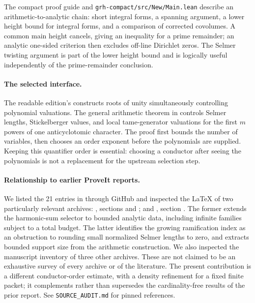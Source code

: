 \documentclass[11pt]{article}
\theoremstyle{remark}\newtheorem{remark}[theorem]{Remark}
\begin{document}
The compact proof guide and \texttt{grh-compact/src/New/Main.lean}
describe an arithmetic-to-analytic chain: short integral forms, a
spanning argument, a lower height bound for integral forms, and a
comparison of corrected covolumes. A common main height cancels, giving
an inequality for a prime remainder; an analytic one-sided criterion then
excludes off-line Dirichlet zeros. The Selmer twisting argument is part of
the lower height bound and is logically useful independently of the
prime-remainder conclusion.

\paragraph{The selected interface.}
The readable edition's 
constructs roots of unity simultaneously controlling polynomial
valuations. The general arithmetic theorem in
 controls Selmer lengths,
Stickelberger values, and local tame-generator valuations for the first
$m$ powers of one anticyclotomic character. The proof first bounds the
number of variables, then chooses an order exponent before the
polynomials are supplied. Keeping this quantifier order is essential:
choosing a conductor after seeing the polynomials is not a replacement
for the upstream selection step.

\paragraph{Relationship to earlier ProveIt reports.}
We listed the 21 entries in  through GitHub and
inspected the LaTeX of two particularly relevant archives:
, sections
 and ; and
, section
. The former extends the harmonic-sum
selector to bounded analytic data, including infinite families subject
to a total budget. The latter identifies the growing ramification index
as an obstruction to rounding small normalized Selmer lengths to zero,
and extracts bounded support size from the arithmetic construction.
We also inspected the manuscript inventory of three other archives.
These are not claimed to be an exhaustive survey of every archive or
of the literature. The present contribution is a different conductor-order
estimate, with a density refinement for a fixed finite packet; it
complements rather than supersedes the cardinality-free results of the
prior report. See \texttt{SOURCE\_AUDIT.md} for pinned references.
\end{document}
